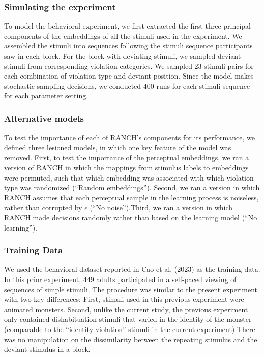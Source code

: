 \documentclass[10pt, letterpaper]{article}
\begin{document}
\hypertarget{simulating-the-experiment}{%
\subsubsection{Simulating the
experiment}\label{simulating-the-experiment}}

To model the behavioral experiment, we first extracted the first three
principal components of the embeddings of all the stimuli used in the
experiment. We assembled the stimuli into sequences following the
stimuli sequence participants saw in each block. For the block with
deviating stimuli, we sampled deviant stimuli from corresponding
violation categories. We sampled 23 stimuli pairs for each combination
of violation type and deviant position. Since the model makes stochastic
sampling decisions, we conducted 400 runs for each stimuli sequence for
each parameter setting.

\hypertarget{alternative-models}{%
\subsubsection{Alternative models}\label{alternative-models}}

To test the importance of each of RANCH's components for its
performance, we defined three lesioned models, in which one key feature
of the model was removed. First, to test the importance of the
perceptual embeddings, we ran a version of RANCH in which the mappings
from stimulus labels to embeddings were permuted, such that which
embedding was associated with which violation type was randomized
(``Random embeddings''). Second, we ran a version in which RANCH assumes
that each perceptual sample in the learning process is noiseless, rather
than corrupted by \(\epsilon\) (``No noise'').Third, we ran a version in
which RANCH made decisions randomly rather than based on the learning
model (``No learning'').

\hypertarget{training-data}{%
\subsubsection{Training Data}\label{training-data}}

We used the behavioral dataset reported in Cao et al. (2023) as the
training data. In this prior experiment, 449 adults participated in a
self-paced viewing of sequences of simple stimuli. The procedure was
similar to the present experiment with two key differences: First,
stimuli used in this previous experiment were animated monsters. Second,
unlike the current study, the previous experiment only contained
dishabituation stimuli that varied in the identity of the monster
(comparable to the ``identity violation'' stimuli in the current
experiment) There was no manipulation on the dissimilarity between the
repeating stimulus and the deviant stimulus in a block.
\end{document}
